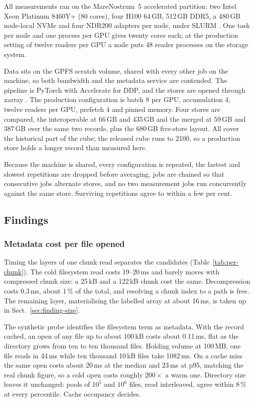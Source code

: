 \documentclass[gmd, manuscript]{copernicus}
\begin{document}
All measurements ran on the MareNostrum~5 accelerated partition: two Intel Xeon Platinum
8460Y+ (80 cores), four H100 64\,GB, 512\,GB DDR5, a 480\,GB node-local NVMe and four NDR200
adapters per node, under SLURM \citep{slurm}. One task per node and one process per GPU gives
twenty cores each; at the production setting of twelve readers per GPU a node puts 48 reader
processes on the storage system.

Data sits on the GPFS scratch volume, shared with every other job on the machine, so both
bandwidth and the metadata service are contended. The pipeline is PyTorch \citep{pytorch} with
Accelerate \citep{accelerate} for DDP, and the stores are opened through xarray \citep{xarray}.
The production configuration is batch 8 per GPU, accumulation 4, twelve readers per GPU,
prefetch 4 and pinned memory. Four stores are compared, the interoperable at 66\,GB and
435\,GB and the merged at 59\,GB and 387\,GB over the same two records, plus the 680\,GB
five-store layout. All cover the historical part of the cube; the released cube runs to 2100,
so a production store holds a longer record than measured here.

Because the machine is shared, every configuration is repeated, the fastest and slowest
repetitions are dropped before averaging, jobs are chained so that consecutive jobs alternate
stores, and no two measurement jobs run concurrently against the same store. Surviving
repetitions agree to within a few per cent.

\subsection{Findings}
\label{sec:findings}

\subsubsection{Metadata cost per file opened}
\label{sec:finding-metadata}

Timing the layers of one chunk read separates the candidates (Table~\ref{tab:per-chunk}). The
cold filesystem read costs 19--20\,ms and barely moves with compressed chunk size: a 25\,kB and
a 122\,kB chunk cost the same. Decompression costs 0.3\,ms, about 1\,\% of the total, and
resolving a chunk index to a path is free. The remaining layer, materialising the labelled
array at about 16\,ms, is taken up in Sect.~\ref{sec:finding-size}.

The synthetic probe identifies the filesystem term as metadata. With the record cached, an open
of any file up to about 100\,kB costs about 0.11\,ms, flat as the directory grows from ten to
ten thousand files. Holding volume at 100\,MB, one file reads in 44\,ms while ten thousand
10\,kB files take 1082\,ms. On a cache miss the same open costs about 20\,ms at the median and
23\,ms at p95, matching the real chunk figure, so a cold open costs roughly $200\times$ a warm
one. Directory size leaves it unchanged: pools of $10^5$ and $10^6$ files, read interleaved,
agree within 8\,\% at every percentile. Cache occupancy decides.
\end{document}
